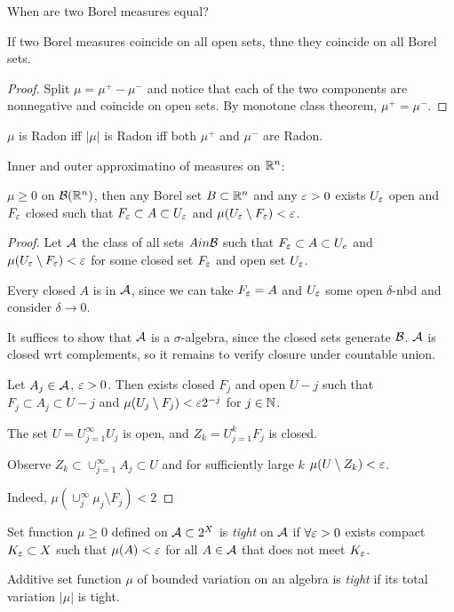 When are two Borel measures equal?
\begin{lemma}
  If two Borel measures coincide on all open sets, thne they
  coincide on all Borel sets.
\end{lemma}

\begin{proof}
  Split $\mu = \mu^+ - \mu^-$ and notice that each of the two
  components are nonnegative and coincide on open sets.
  By monotone class theorem, $\mu^+ = \mu^-$. 
\end{proof}

$\mu$ is Radon iff $\lvert \mu \rvert$ is Radon iff both $\mu^+$
and $\mu^-$ are Radon.

Inner and outer approximatino of measures on $\mathbb{R}^n$:

\begin{theorem}
  $\mu \geq 0$ on $\mathcal{B}(\mathbb{R}^n)$, then any Borel set $B \subset \mathbb{R}^n$ and
  any $\varepsilon > 0$ exists $U_\varepsilon$ open and $F_\varepsilon$ closed such that
  $F_\varepsilon \subset A \subset U_\varepsilon$ and $\mu(U_\varepsilon \setminus F_\varepsilon) < \varepsilon$.
\end{theorem}

\begin{proof}
  Let $\mathcal{A}$ the class of all sets $A in \mathcal{B}$ such that
  $F_\varepsilon \subset A \subset U_e$ and $\mu(U_\varepsilon \setminus F_\varepsilon) < \varepsilon$
  for some closed set $F_\varepsilon$ and open set $U_\varepsilon$.

  Every closed $A$ is in $\mathcal{A}$, since we can take
  $F_\varepsilon = A$ and $U_\varepsilon$ some open $\delta$-nbd
  and consider $\delta \to 0$.

  It suffices to show that $\mathcal{A}$ is a $\sigma$-algebra, since the closed
  sets generate $\mathcal{B}$. $\mathcal{A}$ is closed wrt complements, so it remains
  to verify closure under countable union.

  Let $A_j \in \mathcal{A}$, $\varepsilon > 0$. Then exists closed $F_j$
  and open $U-j$ such that $F_j \subset A_j \subset U-j$ and
  $\mu(U_j \setminus F_j) < \varepsilon 2^{-j}$ for $j \in \mathbb{N}$.

  The set $U = U_{j=1}^\infty U_j$ is open, and $Z_k = U_{j=1}^k F_j$ is closed.

  Observe $Z_k \subset \cup_{j=1}^\infty A_j \subset U$ and for
  sufficiently large $k$ $\mu(U \setminus Z_k) < \varepsilon$.

  Indeed, $\mu(\cup_j^\infty \mu_j \setminus F_j) < 2^{}$ 
\end{proof}

\begin{definition}
  Set function $\mu \geq 0$ defined on $\mathcal{A} \subset 2^X$
  is \emph{tight} on $\mathcal{A}$ if $\forall \varepsilon > 0$ exists compact
  $K_\varepsilon \subset X$ such that $\mu(A) < \varepsilon$ for all $A \in \mathcal{A}$
  that does not meet $K_\varepsilon$.

  Additive set function $\mu$ of bounded variation on an algebra is
  \emph{tight} if its total variation $\lvert \mu \rvert$ is tight.
\end{definition}

